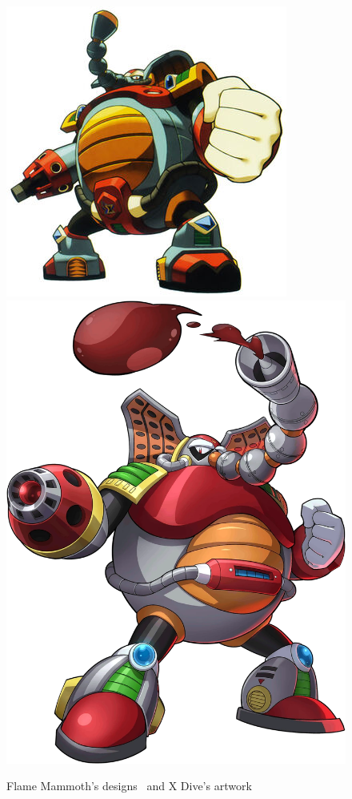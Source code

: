 \begin{figure}[htp]
	\includegraphics[height=\portraitsize]{figures/X1/Flame_mammoth/MHXFlameMammoth.jpg}
	\includegraphics[height=\portraitsize]{figures/X1/Flame_mammoth/Flame_Mammoth.png}
	\caption{Flame Mammoth's designs~\cite{book:MMX_Complete_art} and X Dive's artwork }
\end{figure}

